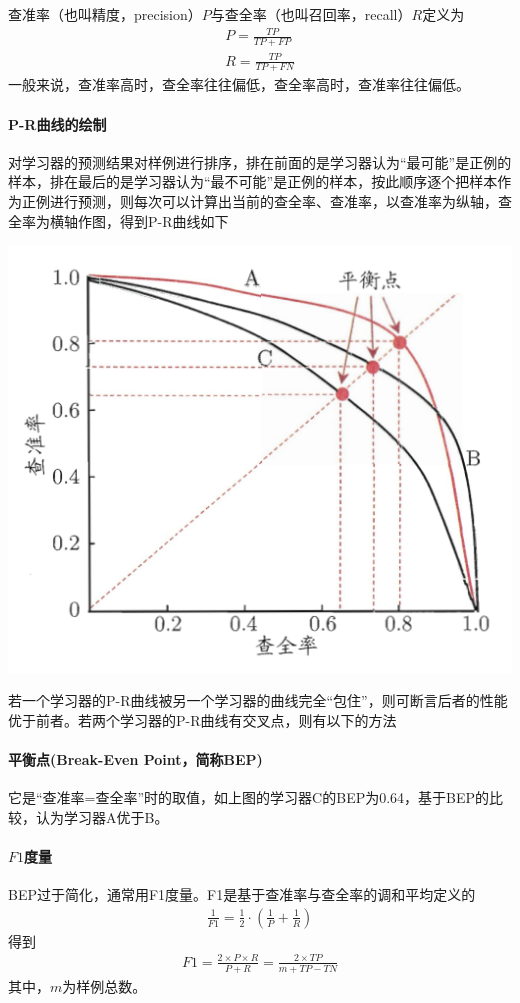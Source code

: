 查准率（也叫精度，precision）$P$与查全率（也叫召回率，recall）$R$定义为
\begin{eqnarray}
P=\frac{TP}{TP+FP}\\
R=\frac{TP}{TP+FN}
\end{eqnarray}
一般来说，查准率高时，查全率往往偏低，查全率高时，查准率往往偏低。

\paragraph{P-R曲线的绘制}对学习器的预测结果对样例进行排序，排在前面的是学习器认为“最可能”是正例的样本，排在最后的是学习器认为“最不可能”是正例的样本，按此顺序逐个把样本作为正例进行预测，则每次可以计算出当前的查全率、查准率，以查准率为纵轴，查全率为横轴作图，得到P-R曲线如下
\begin{center}
\includegraphics[scale=0.8]{../figures/RAMS2.PNG} 
\end{center}
若一个学习器的P-R曲线被另一个学习器的曲线完全“包住”，则可断言后者的性能优于前者。若两个学习器的P-R曲线有交叉点，则有以下的方法
\paragraph{平衡点(Break-Even Point，简称BEP)}它是“查准率=查全率”时的取值，如上图的学习器C的BEP为0.64，基于BEP的比较，认为学习器A优于B。
\paragraph{$F1$度量}BEP过于简化，通常用F1度量。F1是基于查准率与查全率的调和平均定义的
\begin{eqnarray}
\frac{1}{F1}=\frac{1}{2}\cdot(\frac{1}{P}+\frac{1}{R})
\end{eqnarray}
得到
\begin{eqnarray}
F1=\frac{2\times P\times R}{P+R}=\frac{2\times TP}{m+TP-TN}
\end{eqnarray}
其中，$m$为样例总数。
